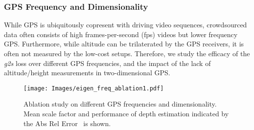 \begin{table*}[bt]

\centering
\caption{Ablation study of different weighting strategies on the KITTI Eigen split~\cite{eigen2014depth}. }


\label{tab:abl_depth}
\end{table*}





\subsubsection{GPS Frequency and Dimensionality}
While GPS is ubiquitously copresent with driving video sequences, crowdsourced data often consists of high frames-per-second (fps) videos but lower frequency GPS. Furthermore, while altitude can be trilaterated by the GPS receivers, it is often not measured by the low-cost setups.  Therefore, we study the efficacy of the \textit{g2s} loss over different GPS frequencies, and the impact of the lack of altitude/height  measurements in two-dimensional GPS. 
\begin{figure}[t!]
\centering
\texttt{[image: Images/eigen\_freq\_ablation1.pdf]}
  \caption{Ablation study on different GPS frequencies and dimensionality. Mean scale factor and performance  of depth estimation indicated by the Abs Rel Error~\cite{eigen2014depth} is shown.}
\label{fig:ablation_freq_gps}
\end{figure}




